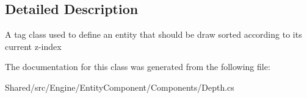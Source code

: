 \subsection{Detailed Description}
A tag class used to define an entity that should be draw sorted according to its current z-\/index 



The documentation for this class was generated from the following file\+:\begin{DoxyCompactItemize}
\item 
Shared/src/\+Engine/\+Entity\+Component/\+Components/Depth.\+cs\end{DoxyCompactItemize}
